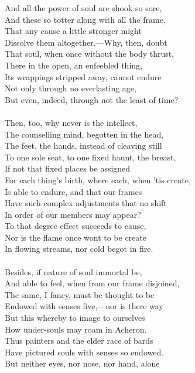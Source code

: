 And all the power of soul are shook so sore,\\
And these so totter along with all the frame,\\
That any cause a little stronger might\\
Dissolve them altogether.—Why, then, doubt\\
That soul, when once without the body thrust,\\
There in the open, an enfeebled thing,\\
Its wrappings stripped away, cannot endure\\
Not only through no everlasting age,\\
But even, indeed, through not the least of time?\\
\\
Then, too, why never is the intellect,\\
The counselling mind, begotten in the head,\\
The feet, the hands, instead of cleaving still\\
To one sole seat, to one fixed haunt, the breast,\\
If not that fixed places be assigned\\
For each thing's birth, where each, when 'tis create,\\
Is able to endure, and that our frames\\
Have such complex adjustments that no shift\\
In order of our members may appear?\\
To that degree effect succeeds to cause,\\
Nor is the flame once wont to be create\\
In flowing streams, nor cold begot in fire.\\
\\
Besides, if nature of soul immortal be,\\
And able to feel, when from our frame disjoined,\\
The same, I fancy, must be thought to be\\
Endowed with senses five,—nor is there way\\
But this whereby to image to ourselves\\
How under-souls may roam in Acheron.\\
Thus painters and the elder race of bards\\
Have pictured souls with senses so endowed.\\
But neither eyes, nor nose, nor hand, alone\\
